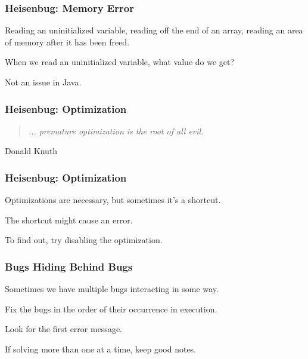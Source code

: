 \begin{frame}
\frametitle{Heisenbug: Memory Error}
\begin{changemargin}{1cm}

Reading an uninitialized variable, reading off the end of an array, reading an area of memory after it has been freed.

When we read an uninitialized variable, what value do we get?


Not an issue in Java. 

\end{changemargin}
\end{frame}

\begin{frame}
\frametitle{Heisenbug: Optimization}
\begin{changemargin}{1cm}

\vspace{2em}
\begin{quote}
	\textit{... premature optimization is the root of all evil.}
\end{quote}
\hfill Donald Knuth


\end{changemargin}
\end{frame}

\begin{frame}
\frametitle{Heisenbug: Optimization}
\begin{changemargin}{1cm}

Optimizations are necessary, but sometimes it's a shortcut.

The shortcut might cause an error.

To find out, try disabling the optimization.

\end{changemargin}
\end{frame}

\begin{frame}
\frametitle{Bugs Hiding Behind Bugs}
\begin{changemargin}{1cm}

Sometimes we have multiple bugs interacting in some way.

Fix the bugs in the order of their occurrence in execution.

Look for the first error message.

If solving more than one at a time, keep good notes.


\end{changemargin}
\end{frame}


